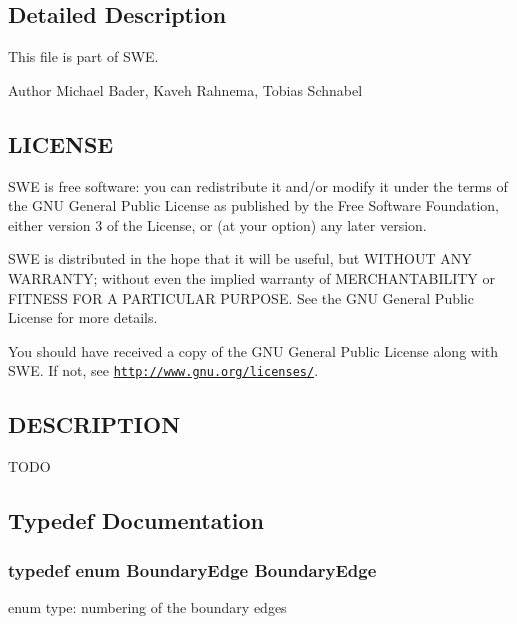 \subsection{Detailed Description}
This file is part of S\+WE.

\begin{DoxyAuthor}{Author}
Michael Bader, Kaveh Rahnema, Tobias Schnabel
\end{DoxyAuthor}
\hypertarget{help_8hh_LICENSE}{}\subsection{L\+I\+C\+E\+N\+SE}\label{help_8hh_LICENSE}
S\+WE is free software\+: you can redistribute it and/or modify it under the terms of the G\+NU General Public License as published by the Free Software Foundation, either version 3 of the License, or (at your option) any later version.

S\+WE is distributed in the hope that it will be useful, but W\+I\+T\+H\+O\+UT A\+NY W\+A\+R\+R\+A\+N\+TY; without even the implied warranty of M\+E\+R\+C\+H\+A\+N\+T\+A\+B\+I\+L\+I\+TY or F\+I\+T\+N\+E\+SS F\+OR A P\+A\+R\+T\+I\+C\+U\+L\+AR P\+U\+R\+P\+O\+SE. See the G\+NU General Public License for more details.

You should have received a copy of the G\+NU General Public License along with S\+WE. If not, see \href{http://www.gnu.org/licenses/}{\tt http\+://www.\+gnu.\+org/licenses/}.\hypertarget{help_8hh_DESCRIPTION}{}\subsection{D\+E\+S\+C\+R\+I\+P\+T\+I\+ON}\label{help_8hh_DESCRIPTION}
T\+O\+DO 

\subsection{Typedef Documentation}
\subsubsection[{\texorpdfstring{Boundary\+Edge}{BoundaryEdge}}]{\setlength{\rightskip}{0pt plus 5cm}typedef enum {\bf Boundary\+Edge}  {\bf Boundary\+Edge}}\hypertarget{scenarios_2SWE__Scenario_8hh_a53b43e70a19e542b4c1ab2da9c6bcc0e}{}\label{scenarios_2SWE__Scenario_8hh_a53b43e70a19e542b4c1ab2da9c6bcc0e}
enum type\+: numbering of the boundary edges 
